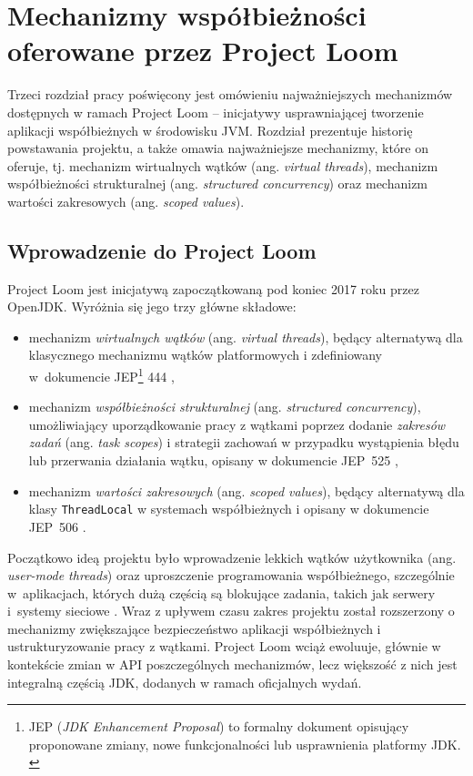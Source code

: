 \chapter{Mechanizmy współbieżności oferowane przez Project Loom}

Trzeci rozdział pracy poświęcony jest omówieniu najważniejszych mechanizmów dostępnych w ramach Project Loom -- inicjatywy usprawniającej tworzenie aplikacji współbieżnych w środowisku JVM. Rozdział prezentuje historię powstawania projektu, a także omawia najważniejsze mechanizmy, które on oferuje, tj. mechanizm wirtualnych wątków (ang. \emph{virtual threads}), mechanizm współbieżności strukturalnej (ang. \emph{structured concurrency}) oraz mechanizm wartości zakresowych (ang. \emph{scoped values}).

\section{Wprowadzenie do Project Loom}

Project Loom jest inicjatywą zapoczątkowaną pod koniec 2017 roku przez OpenJDK. Wyróżnia się jego trzy główne składowe:
\begin{itemize}
    \item mechanizm \emph{wirtualnych wątków} (ang. \emph{virtual threads}), będący alternatywą dla klasycznego mechanizmu wątków platformowych i zdefiniowany w~dokumencie JEP\footnote{JEP (\emph{JDK Enhancement Proposal}) to formalny dokument opisujący proponowane zmiany, nowe funkcjonalności lub usprawnienia platformy JDK. \cite{jep1}} 444 \cite{jep444},
    \item mechanizm \emph{współbieżności strukturalnej} (ang. \emph{structured concurrency}), umożliwiający uporządkowanie pracy z wątkami poprzez dodanie \emph{zakresów zadań} (ang. \emph{task scopes}) i strategii zachowań w przypadku wystąpienia błędu lub przerwania działania wątku, opisany w dokumencie JEP~525 \cite{jep525},
    \item mechanizm \emph{wartości zakresowych} (ang. \emph{scoped values}), będący alternatywą dla klasy \texttt{ThreadLocal} w systemach współbieżnych i opisany w dokumencie JEP~506 \cite{jep506}.
\end{itemize}

Początkowo ideą projektu było wprowadzenie lekkich wątków użytkownika (ang. \emph{user-mode threads}) oraz uproszczenie programowania współbieżnego, szczególnie w~aplikacjach, których dużą częścią są blokujące zadania, takich jak serwery i~systemy sieciowe \cite{openjdk-loom-proposal}. Wraz z upływem czasu zakres projektu został rozszerzony o mechanizmy zwiększające bezpieczeństwo aplikacji współbieżnych i ustrukturyzowanie pracy z wątkami. Project Loom wciąż ewoluuje, głównie w kontekście zmian w API poszczególnych mechanizmów, lecz większość z nich jest integralną częścią JDK, dodanych w ramach oficjalnych wydań.

